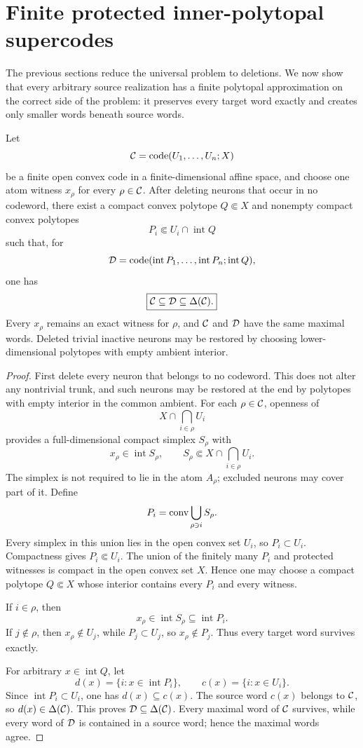 \section{Finite protected inner-polytopal supercodes}
\label{sec:finite-supercodes}

The previous sections reduce the universal problem to deletions.  We now show that every arbitrary source realization has a finite polytopal approximation on the correct side of the problem: it preserves every target word exactly and creates only smaller words beneath source words.

\begin{theorem}
\label{thm:protected-supercode}
Let
\[
 \mathcal C=\operatorname{code}(U_1,\ldots,U_n;X)
\]
be a finite open convex code in a finite-dimensional affine space, and choose one atom witness $x_\rho$ for every $\rho\in\mathcal C$.  After deleting neurons that occur in no codeword, there exist a compact convex polytope $Q\Subset X$ and nonempty compact convex polytopes
\[
 P_i\Subset U_i\cap\operatorname{int}Q
\]
such that, for
\[
 \mathcal D=\operatorname{code}(\operatorname{int}P_1,\ldots,\operatorname{int}P_n;\operatorname{int}Q),
\]
one has
\[
 \boxed{\mathcal C\subseteq\mathcal D\subseteq\Delta(\mathcal C).}
\]
Every $x_\rho$ remains an exact witness for $\rho$, and $\mathcal C$ and $\mathcal D$ have the same maximal words.  Deleted trivial inactive neurons may be restored by choosing lower-dimensional polytopes with empty ambient interior.
\end{theorem}

\begin{proof}
First delete every neuron that belongs to no codeword.  This does not alter any nontrivial trunk, and such neurons may be restored at the end by polytopes with empty interior in the common ambient.  For each $\rho\in\mathcal C$, openness of
\[
 X\cap\bigcap_{i\in\rho}U_i
\]
provides a full-dimensional compact simplex $S_\rho$ with
\[
 x_\rho\in\operatorname{int}S_\rho,
 \qquad
 S_\rho\Subset X\cap\bigcap_{i\in\rho}U_i.
\]
The simplex is not required to lie in the atom $A_\rho$; excluded neurons may cover part of it.  Define
\[
 P_i=\operatorname{conv}\bigcup_{\rho\ni i}S_\rho.
\]
Every simplex in this union lies in the open convex set $U_i$, so $P_i\subset U_i$.  Compactness gives $P_i\Subset U_i$.  The union of the finitely many $P_i$ and protected witnesses is compact in the open convex set $X$.  Hence one may choose a compact polytope $Q\Subset X$ whose interior contains every $P_i$ and every witness.

If $i\in\rho$, then
\[
 x_\rho\in\operatorname{int}S_\rho\subseteq\operatorname{int}P_i.
\]
If $j\notin\rho$, then $x_\rho\notin U_j$, while $P_j\subset U_j$, so $x_\rho\notin P_j$.  Thus every target word survives exactly.

For arbitrary $x\in\operatorname{int}Q$, let
\[
 d(x)=\{i:x\in\operatorname{int}P_i\},
 \qquad
 c(x)=\{i:x\in U_i\}.
\]
Since $\operatorname{int}P_i\subset U_i$, one has $d(x)\subseteq c(x)$.  The source word $c(x)$ belongs to $\mathcal C$, so $d(x)\in\Delta(\mathcal C)$.  This proves $\mathcal D\subseteq\Delta(\mathcal C)$.  Every maximal word of $\mathcal C$ survives, while every word of $\mathcal D$ is contained in a source word; hence the maximal words agree.
\end{proof}

